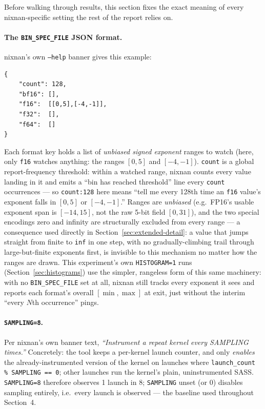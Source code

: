 \documentclass[11pt]{article}
\begin{document}
Before walking through results, this section fixes the exact meaning of every
nixnan-specific setting the rest of the report relies on.

\paragraph{The \texttt{BIN\_SPEC\_FILE} JSON format.} nixnan's own \texttt{--help}
banner gives this example:
\begin{lstlisting}
{
    "count": 128,
    "bf16": [],
    "f16":  [[0,5],[-4,-1]],
    "f32":  [],
    "f64":  []
}
\end{lstlisting}
Each format key holds a list of \emph{unbiased signed exponent} ranges to watch (here,
only \texttt{f16} watches anything: the ranges $[0,5]$ and $[-4,-1]$). \texttt{count}
is a global report-frequency threshold: within a watched range, nixnan counts every
value landing in it and emits a ``bin has reached threshold'' line every \texttt{count}
occurrences --- so \texttt{count:128} here means ``tell me every 128th time an
\texttt{f16} value's exponent falls in $[0,5]$ or $[-4,-1]$.'' Ranges are
\emph{unbiased} (e.g.\ FP16's usable exponent span is $[-14,15]$, not the raw 5-bit
field $[0,31]$), and the two special encodings zero and infinity are structurally
excluded from every range --- a consequence used directly in
Section~\ref{sec:extended-detail}: a value that jumps straight from finite to
\texttt{inf} in one step, with no gradually-climbing trail through large-but-finite
exponents first, is invisible to this mechanism no matter how the ranges are drawn.
This experiment's own \texttt{HISTOGRAM=1} runs (Section~\ref{sec:histograms}) use the
simpler, rangeless form of this same machinery: with no \texttt{BIN\_SPEC\_FILE} set at
all, nixnan still tracks every exponent it sees and reports each format's overall
$[\min,\max]$ at exit, just without the interim ``every $N$th occurrence'' pings.

\paragraph{\texttt{SAMPLING=8}.} Per nixnan's own banner text, \emph{``Instrument a
repeat kernel every SAMPLING times.''} Concretely: the tool keeps a per-kernel launch
counter, and only \emph{enables} the already-instrumented version of the kernel on
launches where \texttt{launch\_count \% SAMPLING == 0}; other launches run the
kernel's plain, uninstrumented SASS. \texttt{SAMPLING=8} therefore observes 1 launch in
8; \texttt{SAMPLING} unset (or 0) disables sampling entirely, i.e.\ every launch is
observed --- the baseline used throughout Section~4.
\end{document}
